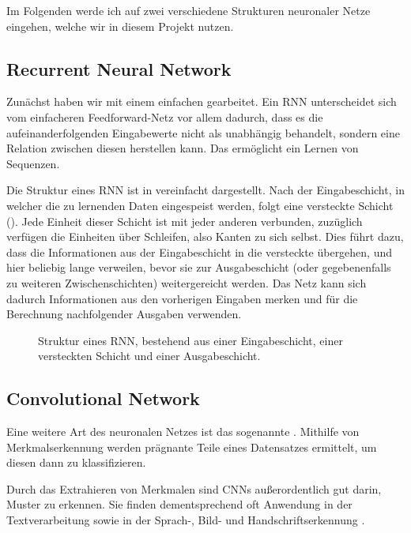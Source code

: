 Im Folgenden werde ich auf zwei verschiedene Strukturen neuronaler Netze eingehen, welche wir in diesem Projekt nutzen.

\subsection{Recurrent Neural Network}

Zunächst haben wir mit einem einfachen  \citep[RNN;][]{elman-rnn} gearbeitet. Ein RNN unterscheidet sich vom einfacheren Feedforward-Netz vor allem dadurch, dass es die aufeinanderfolgenden Eingabewerte nicht als unabhängig behandelt, sondern eine Relation zwischen diesen herstellen kann. Das ermöglicht ein Lernen von Sequenzen.

Die Struktur eines RNN ist in  vereinfacht dargestellt. Nach der Eingabeschicht, in welcher die zu lernenden Daten eingespeist werden, folgt eine versteckte Schicht (). Jede Einheit dieser Schicht ist mit jeder anderen verbunden, zuzüglich verfügen die Einheiten über Schleifen, also Kanten zu sich selbst. Dies führt dazu, dass die Informationen aus der Eingabeschicht in die versteckte übergehen, und hier beliebig lange verweilen, bevor sie zur Ausgabeschicht (oder gegebenenfalls zu weiteren Zwischenschichten) weitergereicht werden. Das Netz kann sich dadurch Informationen aus den vorherigen Eingaben merken und für die Berechnung nachfolgender Ausgaben verwenden.

\begin{figure}
    \centering
    
    \caption[Struktur eines RNN]{Struktur eines RNN, bestehend aus einer Eingabeschicht, einer versteckten Schicht und einer Ausgabeschicht.}
\end{figure}

\subsection{Convolutional Network}

Eine weitere Art des neuronalen Netzes ist das sogenannte  \citep[CNN, manchmal übersetzt als ,,Faltungsnetz'';][]{cnn_orig}.  Mithilfe von Merkmalserkennung
werden prägnante Teile eines Datensatzes ermittelt, um diesen dann zu klassifizieren.

Durch das Extrahieren von Merkmalen sind CNNs außerordentlich gut darin, Muster zu erkennen. Sie finden dementsprechend oft Anwendung in der Textverarbeitung sowie in der Sprach-, Bild- und Handschriftserkennung \citep{sentence_classification, speech_recognition}.

